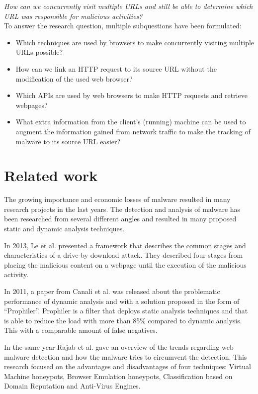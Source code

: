 \documentclass{scrartcl}
\begin{document}
\textit{How can we concurrently visit multiple URLs and still be able to determine which URL was responsible for malicious activities?}\\
\newpage
To answer the research question, multiple subquestions have been formulated:
\begin{itemize}
\item Which techniques are used by browsers to make concurrently visiting multiple URLs possible?
\item How can we link an HTTP request to its source URL without the modification of the used web browser?
\item Which APIs are used by web browsers to make HTTP requests and retrieve webpages?
\item What extra information from the client's (running) machine can be used to augment the information gained from network traffic to make the tracking of malware to its source URL easier?
\end{itemize}

\section{Related work}
The growing importance and economic losses of malware resulted in many research projects in the last years. The detection and analysis of malware has been researched from several different angles \cite{auto_malware,Chang2013} and resulted in many proposed static and dynamic analysis techniques.

In 2013, Le et al. \cite{Le2013} presented a framework that describes the common stages and characteristics of a drive-by download attack. They described four stages from placing the malicious content on a webpage until the execution of the malicious activity.

In 2011, a paper from Canali et al. \cite{Canali2011} was released about the problematic performance of dynamic analysis and with a solution proposed in the form of ``Prophiler''. Prophiler is a filter that deploys static analysis techniques and that is able to reduce the load with more than 85\% compared to dynamic analysis. This with a comparable amount of false negatives.

In the same year Rajab et al. \cite{Rajab11trendsin} gave an overview of the trends regarding web malware detection and how the malware tries to circumvent the detection. This research focused on the advantages and disadvantages of four techniques: Virtual Machine honeypots, Browser Emulation honeypots, Classification based on Domain Reputation and Anti-Virus Engines.
\end{document}
